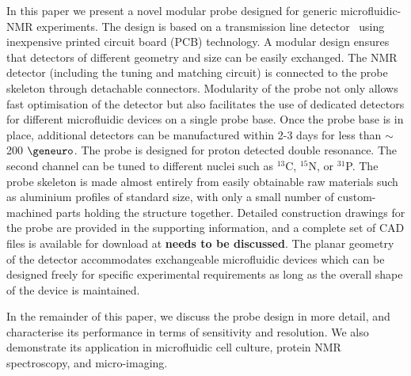 \documentclass[preprint,5p]{elsarticle}
\newcommand{\todo}[1]{{\color{red}\textbf{#1}}}
\begin{document}
In this paper we present a novel modular probe designed for generic 
microfluidic-NMR experiments. The design is based on a transmission line 
detector~\cite{stripline_jan,gream_2016} using inexpensive 
printed circuit board (PCB) technology. A modular design ensures that detectors of 
different geometry and size can be easily exchanged. 
The NMR detector (including the tuning and matching circuit) is connected to the probe 
skeleton through detachable connectors. Modularity of the probe not only allows 
fast optimisation of the detector but also facilitates the use of dedicated detectors 
for different microfluidic devices on a single probe base. 
Once the probe base is in place, additional detectors can be manufactured 
within 2-3 days for less than $\sim$200 $\geneuro$. 
The probe is designed for proton detected double resonance. 
The second channel can be tuned to different nuclei such as $^{13}$C, $^{15}$N, or 
$^{31}$P. The probe skeleton is made almost entirely from easily obtainable raw materials 
such as aluminium profiles of standard size, with only a small number of 
custom-machined parts holding the structure together. 
Detailed construction drawings for the probe are provided in the supporting 
information, and a complete set of CAD files is available for download at \todo{needs to be discussed}.
The planar geometry of the detector accommodates exchangeable microfluidic devices 
which can be designed freely for specific experimental requirements as long as the 
overall shape of the device is maintained. 

In the remainder of this paper, we discuss the probe design in more detail, 
and characterise its performance in terms of sensitivity and resolution. 
We also demonstrate its application in microfluidic cell culture, 
protein NMR spectroscopy, and micro-imaging. 
\end{document}

